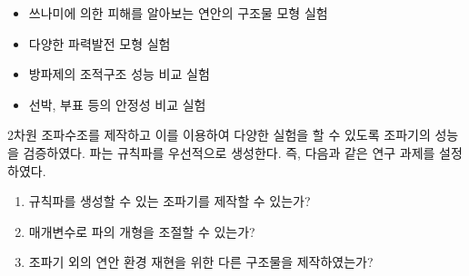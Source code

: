 \begin{itemize}
    \item 쓰나미에 의한 피해를 알아보는 연안의 구조물 모형 실험
    \item 다양한 파력발전 모형 실험
    \item 방파제의 조적구조 성능 비교 실험
    \item 선박, 부표 등의 안정성 비교 실험
\end{itemize}

2차원 조파수조를 제작하고 이를 이용하여 다양한 실험을 할 수 있도록 조파기의 성능을 검증하였다. 파는 규칙파를 우선적으로 생성한다. 즉, 다음과 같은 연구 과제를 설정하였다.

\begin{enumerate}
    \item 규칙파를 생성할 수 있는 조파기를 제작할 수 있는가?
    \item 매개변수로 파의 개형을 조절할 수 있는가?
    \item 조파기 외의 연안 환경 재현을 위한 다른 구조물을 제작하였는가?
\end{enumerate}